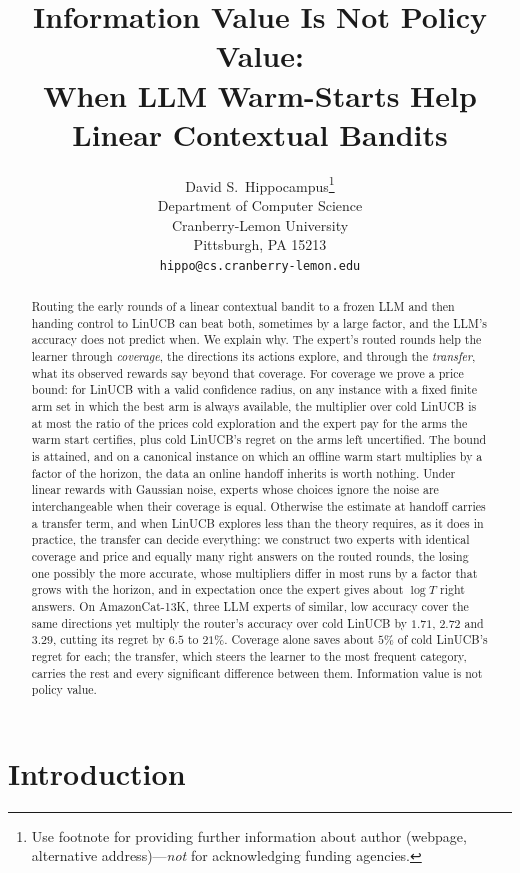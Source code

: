 \documentclass{article}
\title{Information Value Is Not Policy Value:\\ When LLM Warm-Starts Help Linear Contextual Bandits}
\author{%
  David S.~Hippocampus\thanks{Use footnote for providing further information
    about author (webpage, alternative address)---\emph{not} for acknowledging
    funding agencies.} \\
  Department of Computer Science\\
  Cranberry-Lemon University\\
  Pittsburgh, PA 15213 \\
  \texttt{hippo@cs.cranberry-lemon.edu} \\
}
\theoremstyle{definition}
\theoremstyle{remark}
\theoremstyle{remark}
\begin{document}
\maketitle
\begin{abstract}
Routing the early rounds of a linear contextual bandit to a frozen LLM and
then handing control to LinUCB can beat both, sometimes by a large factor,
and the LLM's accuracy does not predict when. We explain why. The expert's
routed rounds help the learner through \emph{coverage}, the directions its
actions explore, and through the \emph{transfer}, what its observed rewards
say beyond that coverage. For coverage we prove a price bound: for LinUCB
with a valid confidence radius, on any instance with a fixed finite arm set in
which the best arm is always available, the multiplier over cold LinUCB is at
most the ratio of the prices cold exploration and the expert pay for the arms
the warm start certifies, plus cold LinUCB's regret on the arms left
uncertified. The bound is attained, and on a canonical instance on which an
offline warm start multiplies by a factor of the horizon, the data an online
handoff inherits is worth nothing. Under linear rewards with Gaussian noise,
experts whose choices ignore the noise are interchangeable when their
coverage is equal. Otherwise the estimate at handoff carries a transfer term,
and when LinUCB explores less than the theory requires, as it does in
practice, the transfer can decide everything: we construct two experts with
identical coverage and price and equally many right answers on the routed
rounds, the losing one possibly the more accurate, whose multipliers differ
in most runs by a factor that grows with the horizon, and in expectation once
the expert gives about $\log T$ right answers. On AmazonCat-13K, three LLM
experts of similar, low accuracy cover the same directions yet multiply the
router's accuracy over cold LinUCB by $1.71$, $2.72$ and $3.29$, cutting its
regret by $6.5$ to $21\%$. Coverage alone saves about $5\%$ of
cold LinUCB's regret for each; the transfer, which steers the learner to the
most frequent category, carries the rest and every significant difference
between them. Information value is not policy value.
\end{abstract}


\section{Introduction}
\label{sec:intro}
\end{document}
